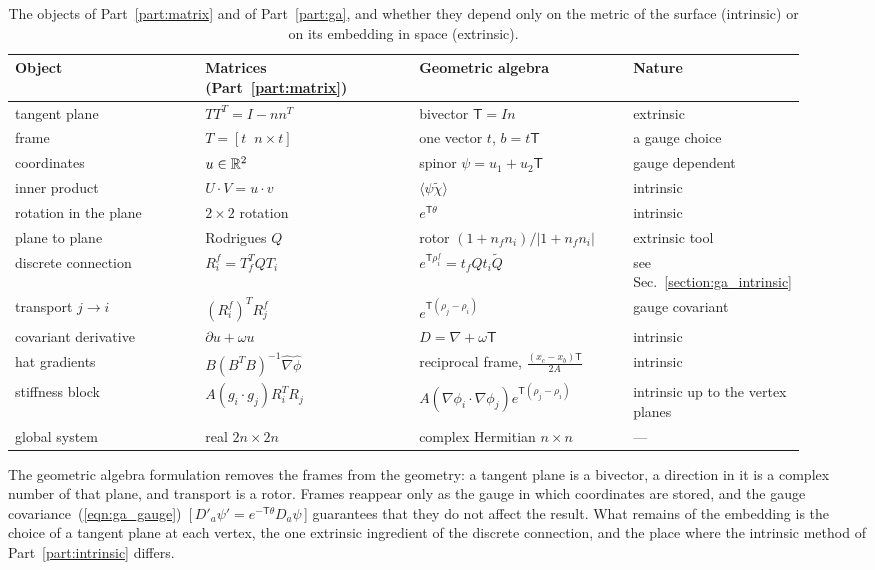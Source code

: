 \begin{table}[t]
\centering
\caption{The objects of Part~\ref{part:matrix} and of Part~\ref{part:ga}, and whether they depend only on the metric of the surface (intrinsic) or on its embedding in space (extrinsic).}
\label{tab:dictionary}
\footnotesize
\setlength{\tabcolsep}{3pt}
\begin{tabular}{p{0.24\linewidth} p{0.27\linewidth} p{0.27\linewidth} p{0.14\linewidth}}
\toprule
Object & Matrices (Part~\ref{part:matrix}) & Geometric algebra & Nature \\
\midrule
tangent plane & $T T^T = I - n n^T$ & bivector $\mathsf T = I n$ & extrinsic \\
frame & $T = [t \;\; n \times t]$ & one vector $t$, $b = t \mathsf T$ & a gauge choice \\
coordinates & $u \in \mathbb{R}^2$ & spinor $\psi = u_1 + u_2 \mathsf T$ & gauge dependent \\
inner product & $U\cdot V = u\cdot v$ & $\langle\psi\widetilde\chi\rangle$ & intrinsic \\
rotation in the plane & $2 \times 2$ rotation & $e^{\mathsf T \theta}$ & intrinsic \\
plane to plane & Rodrigues $Q$ & rotor $(1 + n_f n_i)/|1 + n_f n_i|$ & extrinsic tool \\
discrete connection & $R_i^f = T_f^T Q T_i$ & $e^{\mathsf T \rho_i^f} = t_f Q t_i \widetilde Q$ & see Sec.~\ref{section:ga_intrinsic} \\
transport $j \to i$ & $(R_i^f)^T R_j^f$ & $e^{\mathsf T (\rho_j - \rho_i)}$ & gauge covariant \\
covariant derivative & $\partial u + \omega u$ & $D = \nabla + \omega \mathsf T$ & intrinsic \\
hat gradients & $B (B^T B)^{-1} \hat\nabla\hat\phi$ & reciprocal frame, $\frac{(x_c - x_b)\mathsf T}{2A}$ & intrinsic \\
stiffness block & $A (g_i \cdot g_j) R_i^T R_j$ & $A (\nabla\phi_i \cdot \nabla\phi_j) e^{\mathsf T(\rho_j - \rho_i)}$ & intrinsic up to the vertex planes \\
global system & real $2n \times 2n$ & complex Hermitian $n \times n$ & --- \\
\bottomrule
\end{tabular}
\end{table}

The geometric algebra formulation removes the frames from the geometry: a tangent plane is a bivector, a direction in it is a complex number of that plane, and transport is a rotor. Frames reappear only as the gauge in which coordinates are stored, and the gauge covariance~(\ref{eqn:ga_gauge})~[\,$D'_a\psi' = e^{-\mathsf T\theta}D_a\psi$\,] guarantees that they do not affect the result. What remains of the embedding is the choice of a tangent plane at each vertex, the one extrinsic ingredient of the discrete connection, and the place where the intrinsic method of Part~\ref{part:intrinsic} differs.
